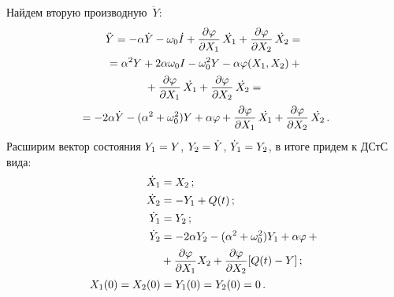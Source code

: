 \begin{multicols}{2}
Найдем вторую производную~$\ddot{Y}$:
\begin{multline*}
\ddot{Y} =  -\alpha \dot{Y}- \omega_0 \dot{I} + \displaystyle\frac{\displaystyle \partial \varphi\mathstrut}{\displaystyle \partial X_1\mathstrut} \,
\dot{X_1} + \displaystyle\frac{\displaystyle \partial \varphi\mathstrut}{\displaystyle \partial X_2\mathstrut} \,\dot{X_2}={}\\
{}=  \alpha^2 Y + 2\alpha \omega_0 I   - \omega_0^2 Y - \alpha \varphi(X_1,X_2) + {}\\
{}+
\displaystyle\frac{\displaystyle \partial \varphi\mathstrut}{\displaystyle \partial X_1\mathstrut}\, \dot{X_1} + 
\displaystyle\frac{\displaystyle \partial \varphi\mathstrut}{\displaystyle \partial X_2\mathstrut}\, \dot{X_2}={}\\
  {}= -2\alpha \dot{Y} -(\alpha^2 + \omega_0^2) Y + \alpha \varphi +
     \displaystyle\frac{\displaystyle \partial \varphi\mathstrut}{\displaystyle \partial X_1\mathstrut}\, \dot{X_1} + 
     \displaystyle\frac{\displaystyle \partial \varphi\mathstrut}{\displaystyle \partial X_2\mathstrut}\, \dot{X_2}\,.
     \end{multline*}
Расширим вектор состояния
$Y_1\hm=Y$, $Y_2\hm=\dot{Y}$, $\dot{Y}_1 \hm= Y_2$, в итоге придем к ДСтС вида:
   \begin{align*}
    \dot{X}_1 &= X_2\,; \\
    \dot{X}_2 &= -Y_1 + Q(t)\,; \\
    \dot{Y}_1 &= Y_2\,; \\
    \dot{Y}_2 &= -2\alpha Y_2 -(\alpha^2 + \omega_0^2) Y_1 + \alpha \varphi +{}\\
   &{}+
 \displaystyle\frac{\displaystyle \partial \varphi\mathstrut}{\displaystyle \partial X_1\mathstrut} X_2 + 
 \displaystyle\frac{\displaystyle \partial \varphi\mathstrut}{\displaystyle \partial X_2\mathstrut} [ Q(t)-Y]\,;\\
    X_1(0) = X_2(0) &= Y_1(0) = Y_2(0) = 0\,.
\end{align*}


\end{multicols}
